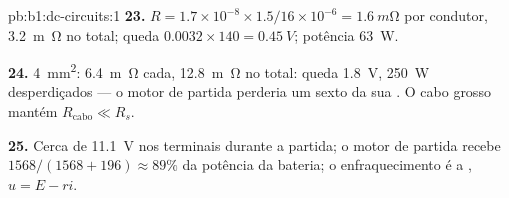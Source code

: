 \begin{solution}{pb:b1:dc-circuits:1}
\textbf{23.} $R = 1.7\times10^{-8} \times 1.5/16\times10^{-6} =
\qty{1.6}{m\ohm}$ por condutor, \qty{3.2}{m\ohm} no total; queda $0.0032
\times 140 = \qty{0.45}{V}$; potência \qty{63}{W}.

\textbf{24.} \qty{4}{mm^2}: \qty{6.4}{m\ohm} cada, \qty{12.8}{m\ohm}
no total: queda \qty{1.8}{V}, \qty{250}{W} desperdiçados --- o motor de partida perderia
um sexto da sua . O cabo grosso mantém $R_{\text{cabo}} \ll R_s$.

\textbf{25.} Cerca de \qty{11.1}{V} nos terminais durante a partida; o
motor de partida recebe $1568/(1568 + 196) \approx 89\%$ da potência da
bateria; o enfraquecimento é a , $u = E - ri$.
\end{solution}
